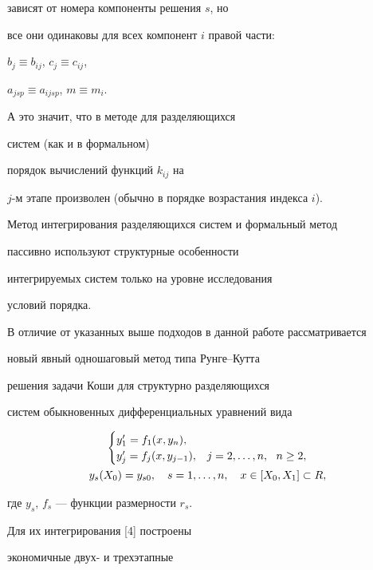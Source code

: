зависят от номера компоненты решения $s$, но


все они одинаковы для всех компонент $i$ правой части:


$b_{j} \equiv b_{ij}$, $c_{j} \equiv c_{ij}$,


$a_{jsp} \equiv a_{ijsp}$, $m\equiv m_{i}$.


А это значит, что в методе для разделяющихся


систем (как и в формальном)


порядок вычислений функций $k_{ij}$ на


$j$-м этапе произволен (обычно в порядке возрастания индекса $i$). 


Метод интегрирования разделяющихся систем и формальный метод


пассивно используют структурные особенности 


интегрируемых систем только на уровне исследования


условий порядка.





В отличие от указанных выше подходов в данной работе рассматривается


новый явный одношаговый метод типа Рунге--Кутта


решения задачи Коши для структурно разделяющихся


систем обыкновенных дифференциальных уравнений вида


\begin{gather}


\begin{cases}


y_{1}'=f_{1}(x,y_{n}), & \ \\


y_{j}'=f_{j}(x,y_{j-1}), & j=2,\dotsc ,n,\ \ n\geq 2,


\end{cases}


\label{frmm1} \\


y_{s}(X_{0})=y_{s0},\quad s=1,\dotsc ,n,\quad


x \in [X_{0},X_{1}] \subset R, \notag


\end{gather}


где $y_{s}$, $f_{s}$ --- функции размерности $r_s$.


Для их интегрирования [4] построены


экономичные двух- и трехэтапные


